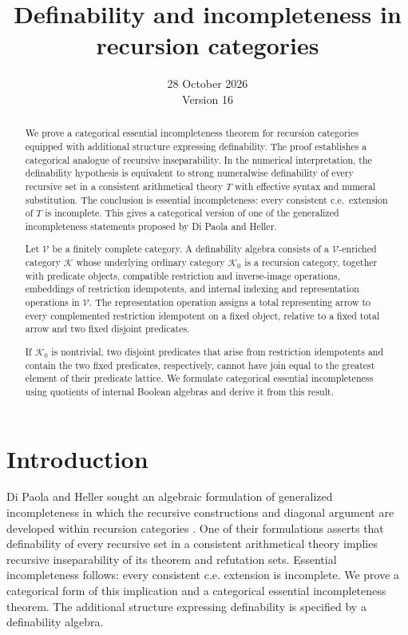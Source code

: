 \documentclass[11pt]{article}
\title{Definability and incompleteness in recursion categories}
\author{}
\date{28 October 2026\\Version 16}
\theoremstyle{definition}
\theoremstyle{remark}
\begin{document}
\maketitle
\begin{abstract}
We prove a categorical essential incompleteness theorem for recursion
categories equipped with additional structure expressing definability.
The proof establishes a categorical analogue of recursive inseparability.
In the numerical interpretation, the definability hypothesis is equivalent
to strong numeralwise definability of every recursive set in a consistent
arithmetical theory $T$ with effective syntax and numeral substitution.
The conclusion is essential incompleteness: every consistent c.e.\ extension
of $T$ is incomplete. This gives a categorical version of one of the
generalized incompleteness statements proposed by Di Paola and Heller.

Let $\mathscr V$ be a finitely complete category. A definability algebra
consists of a $\mathscr V$-enriched category $\mathcal K$ whose underlying
ordinary category $\mathcal K_0$ is a recursion category, together with
predicate objects, compatible restriction and inverse-image operations,
embeddings of restriction idempotents, and internal indexing and
representation operations in $\mathscr V$. The representation operation
assigns a total representing arrow to every complemented restriction
idempotent on a fixed object, relative to a fixed total arrow and two
fixed disjoint predicates.

If $\mathcal K_0$ is nontrivial, two disjoint predicates that arise
from restriction idempotents and contain the two fixed predicates,
respectively, cannot have join equal to the greatest element of their
predicate lattice. We formulate categorical essential incompleteness
using quotients of internal Boolean algebras and derive it from this
result.
\end{abstract}

\section{Introduction}
\label{sec:introduction}

Di Paola and Heller sought an algebraic formulation of generalized
incompleteness in which the recursive constructions and diagonal
argument are developed within recursion categories
\cite[pp.~594--596]{DPH}.
One of their formulations asserts that definability of every
recursive set in a consistent arithmetical theory implies recursive
inseparability of its theorem and refutation sets. Essential
incompleteness follows: every consistent c.e. extension is incomplete.
We prove a categorical form of this implication and a categorical
essential incompleteness theorem. The additional structure expressing
definability is specified by a definability algebra.
\end{document}
